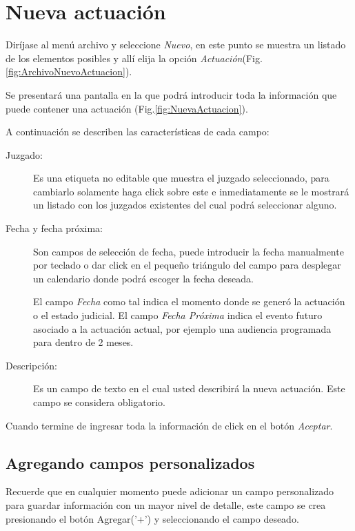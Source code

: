 \section{Nueva actuaci\'on}
\label{sec:nuevaActuacion}
Dir\'ijase al men\'u archivo y seleccione \emph{Nuevo}, en este punto se muestra un listado de los elementos posibles y
all\'i elija la opci\'on \emph{Actuaci\'on}(Fig.\ref{fig:ArchivoNuevoActuacion}). 
  

Se presentar\'a una pantalla en la que podr\'a introducir toda la informaci\'on
que puede contener una actuaci\'on (Fig.\ref{fig:NuevaActuacion}). 
  

 A continuaci\'on se describen las
caracter\'isticas de cada campo:

\begin{description}
\item[Juzgado:]Es una etiqueta no editable que muestra el juzgado
seleccionado, para cambiarlo solamente haga click sobre este
\footnotemark[\value{footnote}]
e inmediatamente
se le mostrar\'a un listado con los juzgados existentes del cual podr\'a
seleccionar alguno.
\item[Fecha y fecha pr\'oxima:]Son campos de selecci\'on de fecha, puede introducir la fecha manualmente por teclado o dar click en el peque\~no tri\'angulo del campo para desplegar un calendario donde podr\'a escoger la fecha deseada.

El campo \emph{Fecha} como tal indica el momento donde se gener\'o la actuaci\'on o el estado judicial. El campo \emph{Fecha Pr\'oxima} indica el evento futuro asociado a la actuaci\'on actual, por ejemplo una audiencia programada para dentro de 2 meses. 
\item[Descripci\'on:]Es un campo de texto en el cual usted describir\'a la
nueva actuaci\'on. Este campo se considera obligatorio.
\end{description}

Cuando termine de ingresar toda la informaci\'on de click en el bot\'on \emph{Aceptar}.

\subsection{Agregando campos personalizados}
\label{sec:agregarCamposActuacion}
Recuerde que en cualquier momento puede adicionar un campo personalizado para guardar informaci\'on con un mayor nivel de detalle, este campo se crea presionando el bot\'on Agregar('+') y seleccionando el campo deseado.

